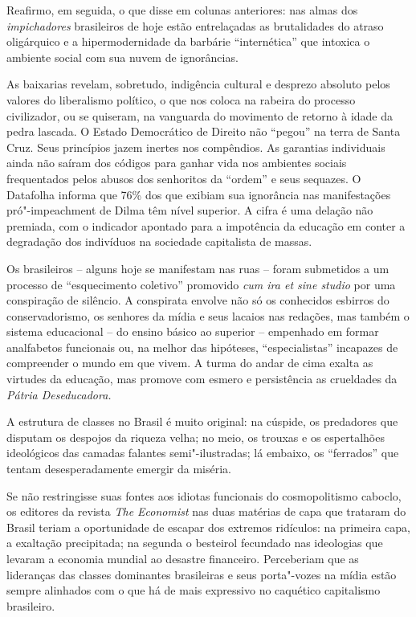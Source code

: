 Reafirmo, em seguida, o que disse em colunas anteriores: nas almas dos
\emph{impichadores} brasileiros de hoje estão entrelaçadas as
brutalidades do atraso oligárquico e a hipermodernidade da barbárie
``internética'' que intoxica o ambiente social com sua nuvem de
ignorâncias.

As baixarias revelam, sobretudo, indigência cultural e desprezo absoluto
pelos valores do liberalismo político, o que nos coloca na rabeira do
processo civilizador, ou se quiseram, na vanguarda do movimento de
retorno à idade da pedra lascada. O Estado Democrático de Direito não
``pegou'' na terra de Santa Cruz. Seus princípios jazem inertes nos
compêndios. As garantias individuais ainda não saíram dos códigos para
ganhar vida nos ambientes sociais frequentados pelos abusos dos
senhoritos da ``ordem'' e seus sequazes. O Datafolha informa que 76\%
dos que exibiam sua ignorância nas manifestações pró"-impeachment de
Dilma têm nível superior. A cifra é uma delação não premiada, com o
indicador apontado para a impotência da educação em conter a degradação
dos indivíduos na sociedade capitalista de massas.

Os brasileiros -- alguns hoje se manifestam nas ruas -- foram submetidos
a um processo de ``esquecimento coletivo'' promovido \emph{cum ira et sine
studio} por uma conspiração de silêncio. A conspirata envolve não só os
conhecidos esbirros do conservadorismo, os senhores da mídia e seus
lacaios nas redações, mas também o sistema educacional -- do ensino
básico ao superior -- empenhado em formar analfabetos funcionais ou, na
melhor das hipóteses, ``especialistas'' incapazes de compreender o mundo
em que vivem. A turma do andar de cima exalta as virtudes da educação,
mas promove com esmero e persistência as crueldades da \emph{Pátria
Deseducadora.}

A estrutura de classes no Brasil é muito original: na cúspide, os
predadores que disputam os despojos da riqueza velha; no meio, os
trouxas e os espertalhões ideológicos das camadas falantes
semi"-ilustradas; lá embaixo, os ``ferrados'' que tentam desesperadamente
emergir da miséria.

Se não restringisse suas fontes aos idiotas funcionais do cosmopolitismo
caboclo, os editores da revista \emph{The Economist} nas duas matérias de
capa que trataram do Brasil teriam a oportunidade de escapar dos
extremos ridículos: na primeira capa, a exaltação precipitada; na
segunda o besteirol fecundado nas ideologias que levaram a economia
mundial ao desastre financeiro. Perceberiam que as lideranças das
classes dominantes brasileiras e seus porta"-vozes na mídia estão sempre
alinhados com o que há de mais expressivo no caquético capitalismo
brasileiro.

